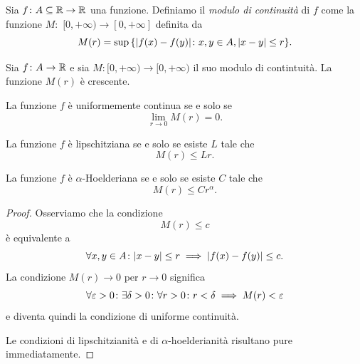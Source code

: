 \begin{definition}
Sia $f\colon A\subseteq {\mathbb R} \to{\mathbb R}$ una funzione.
Definiamo il \emph{modulo di continuità}%
%
 di $f$ come la funzione
$M\colon$ $[0,+\infty) \to [0,+\infty]$ definita da
\[
  M(r) = \sup {\left\{ {\left|f(x)-f(y)\right|}\colon x,y \in A, {\left|x-y\right|} \le r \right\}}.
\]
\end{definition}

\begin{theorem}
Sia $f\colon A\to {\mathbb R}$ e sia $M\colon [0,+\infty)\to [0,+\infty)$ il suo
modulo di contintuità.
La funzione $M(r)$ è crescente.

La funzione $f$ è uniformemente continua se e solo se
\[
  \lim_{r\to 0} M(r) = 0.
\]

La funzione $f$ è lipschitziana se e solo se esiste $L$ tale che
\[
  M(r) \le Lr.
\]

La funzione $f$ è $\alpha$-Hoelderiana se e solo se esiste $C$ tale che
\[
  M(r) \le C r^\alpha.
\]
\end{theorem}
%
\begin{proof}
Osserviamo che la condizione
\[
   M(r) \le c
\]
è equivalente a
\[
\forall x,y\in A \colon {\left|x-y\right|}\le r \implies  {\left|f(x)-f(y)\right|} \le c.
\]
La condizione $M(r)\to 0$ per $r \to 0$ significa
\[
 \forall \varepsilon>0\colon \exists \delta>0 \colon \forall r>0\colon r<\delta \implies M(r)<\varepsilon
\]
e diventa quindi la condizione di uniforme continuità.

Le condizioni di lipschitzianità e di $\alpha$-hoelderianità risultano pure immediatamente.
\end{proof}


